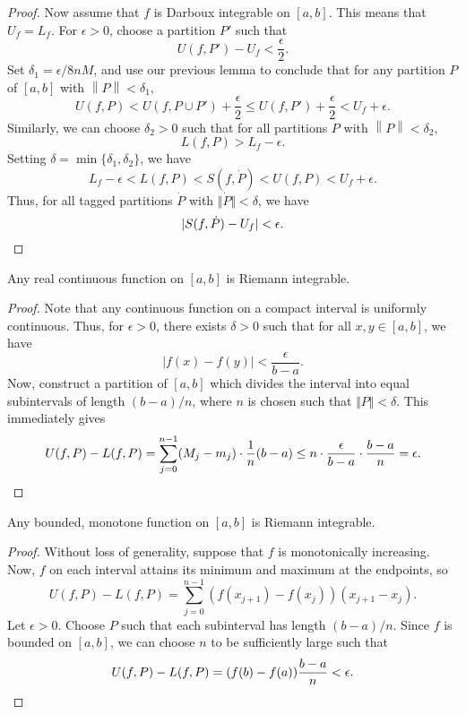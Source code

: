 \documentclass[11pt]{article}
\newcommand\norm[1]{\left\lVert#1\right\rVert}
\theoremstyle{definition}
\theoremstyle{remark}
\numberwithin{equation}{module}
\begin{document}
\begin{proof}
        \noindent
        Now assume that $f$ is Darboux integrable on $[a, b]$. This means that $U_f
        = L_f$. For $\epsilon > 0$, choose a partition $P'$ such that \[
            U(f, P') - U_f < \frac{\epsilon}{2}.
        \] Set $\delta_1 = \epsilon / 8nM$, and use our previous lemma to conclude
        that for any partition $P$ of $[a, b]$ with $\norm{P} < \delta_1$, \[
            U(f, P) < U(f, P \cup P') + \frac{\epsilon}{2} \leq U(f, P') +
            \frac{\epsilon}{2} < U_f + \epsilon.
        \] Similarly, we can choose $\delta_2 > 0$ such that for all partitions $P$
        with $\norm{P} < \delta_2$, \[
            L(f, P) > L_f - \epsilon.
        \] Setting $\delta = \min\{\delta_1, \delta_2\}$, we have \[
            L_f - \epsilon < L(f, P) < S(f, \dot{P}) < U(f, P) < U_f + \epsilon.
        \] Thus, for all tagged partitions $\dot{P}$ with $\Vert\dot{P}\Vert <
        \delta$, we have \[
            |S(f, \dot{P}) - U_f| < \epsilon. \qedhere
        \] 

        \end{proof}

    \begin{theorem}
        Any real continuous function on $[a, b]$ is Riemann integrable.
    \end{theorem}
    \begin{proof}
        Note that any continuous function on a compact interval is uniformly continuous.
        Thus, for $\epsilon > 0$, there exists $\delta > 0$ such that for all $x, y
        \in [a, b]$, we have \[
            |f(x) - f(y)| < \frac{\epsilon}{b - a}.
        \] Now, construct a partition of $[a, b]$ which divides the interval into
        equal subintervals of length $(b - a) / n$, where $n$ is chosen such that
        $\Vert P\Vert < \delta$. This immediately gives \[
            U(f, P) - L(f, P) = \sum_{j = 0}^{n - 1} (M_j - m_j)\cdot \frac{1}{n}(b
            - a) \leq n\cdot \frac{\epsilon}{b - a}\cdot \frac{b - a}{n} = \epsilon.
            \qedhere
        \] 
    \end{proof}

    \begin{theorem}
        Any bounded, monotone function on $[a, b]$ is Riemann integrable.
    \end{theorem}
    \begin{proof}
        Without loss of generality, suppose that $f$ is monotonically increasing.
        Now, $f$ on each interval attains its minimum and maximum at the endpoints,
        so \[
            U(f, P) - L(f, P) = \sum_{j = 0}^{n - 1} (f(x_{j + 1}) - f(x_j))(x_{j +
            1} - x_j).
        \] Let $\epsilon > 0$. Choose $P$ such that each subinterval has length $(b
        - a) / n$. Since $f$ is bounded on $[a, b]$, we can choose $n$ to be
        sufficiently large such that \[
            U(f, P) - L(f, P) = (f(b) - f(a))\frac{b - a}{n} < \epsilon. \qedhere
        \] 
    \end{proof}
\end{document}

